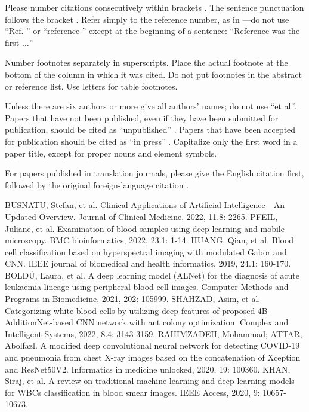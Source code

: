 \documentclass[conference]{IEEEtran}
\begin{document}
Please number citations consecutively within brackets \cite{b1}. The 
sentence punctuation follows the bracket \cite{b2}. Refer simply to the reference 
number, as in \cite{b3}---do not use ``Ref. \cite{b3}'' or ``reference \cite{b3}'' except at 
the beginning of a sentence: ``Reference \cite{b3} was the first $\ldots$''

Number footnotes separately in superscripts. Place the actual footnote at 
the bottom of the column in which it was cited. Do not put footnotes in the 
abstract or reference list. Use letters for table footnotes.

Unless there are six authors or more give all authors' names; do not use 
``et al.''. Papers that have not been published, even if they have been 
submitted for publication, should be cited as ``unpublished'' \cite{b4}. Papers 
that have been accepted for publication should be cited as ``in press'' \cite{b5}. 
Capitalize only the first word in a paper title, except for proper nouns and 
element symbols.

For papers published in translation journals, please give the English 
citation first, followed by the original foreign-language citation \cite{b6}.

\begin{thebibliography}{00}
 BUSNATU, Ștefan, et al. Clinical Applications of Artificial Intelligence—An Updated Overview. Journal of Clinical Medicine, 2022, 11.8: 2265.
 PFEIL, Juliane, et al. Examination of blood samples using deep learning and mobile microscopy. BMC bioinformatics, 2022, 23.1: 1-14.
 HUANG, Qian, et al. Blood cell classification based on hyperspectral imaging with modulated Gabor and CNN. IEEE journal of biomedical and health informatics, 2019, 24.1: 160-170.
 BOLDÚ, Laura, et al. A deep learning model (ALNet) for the diagnosis of acute leukaemia lineage using peripheral blood cell images. Computer Methods and Programs in Biomedicine, 2021, 202: 105999.
 SHAHZAD, Asim, et al. Categorizing white blood cells by utilizing deep features of proposed 4B-AdditionNet-based CNN network with ant colony optimization. Complex and Intelligent Systems, 2022, 8.4: 3143-3159.
 RAHIMZADEH, Mohammad; ATTAR, Abolfazl. A modified deep convolutional neural network for detecting COVID-19 and pneumonia from chest X-ray images based on the concatenation of Xception and ResNet50V2. Informatics in medicine unlocked, 2020, 19: 100360.
 KHAN, Siraj, et al. A review on traditional machine learning and deep learning models for WBCs classification in blood smear images. IEEE Access, 2020, 9: 10657-10673.
\end{thebibliography}
\vspace{12pt}
\color{red}
\end{document}

